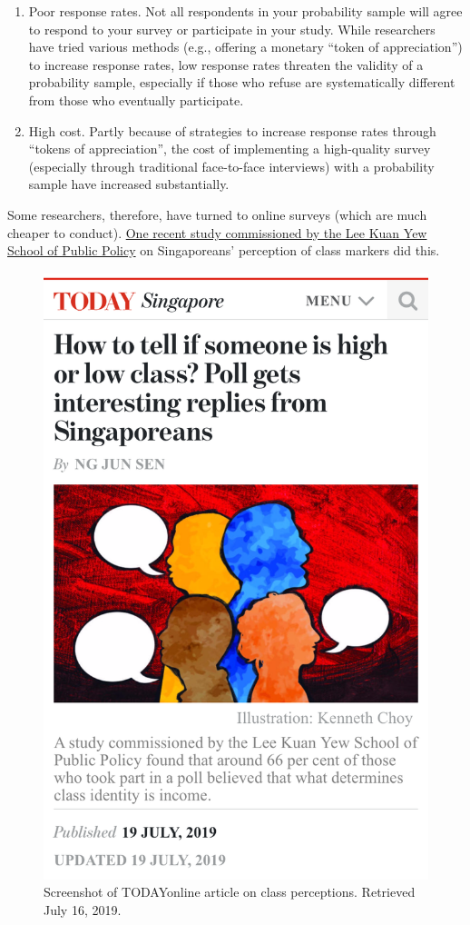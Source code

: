 \documentclass[openany]{book}
\providecommand{\tightlist}{%
  \setlength{\itemsep}{0pt}\setlength{\parskip}{0pt}}
\begin{document}
\begin{enumerate}
\def\labelenumi{\arabic{enumi}.}
\tightlist
\item
  Poor response rates. Not all respondents in your probability sample
  will agree to respond to your survey or participate in your study.
  While researchers have tried various methods (e.g., offering a
  monetary ``token of appreciation'') to increase response rates, low
  response rates threaten the validity of a probability sample,
  especially if those who refuse are systematically different from those
  who eventually participate.
\item
  High cost. Partly because of strategies to increase response rates
  through ``tokens of appreciation'', the cost of implementing a
  high-quality survey (especially through traditional face-to-face
  interviews) with a probability sample have increased substantially.
\end{enumerate}

Some researchers, therefore, have turned to online surveys (which are
much cheaper to conduct).
\href{https://lkyspp.nus.edu.sg/docs/default-source/gia-documents/cars_-condos-and-cai-png-survey-(high-res).pdf}{One
recent study commissioned by the Lee Kuan Yew School of Public Policy}
on Singaporeans' perception of class markers did this.

\begin{figure}

{\centering \includegraphics[width=0.5\linewidth]{images/samples/today_classpercept} 

}

\caption{Screenshot of TODAYonline article on class perceptions. Retrieved July 16, 2019.}\label{fig:today-classmarkers}
\end{figure}
\end{document}
